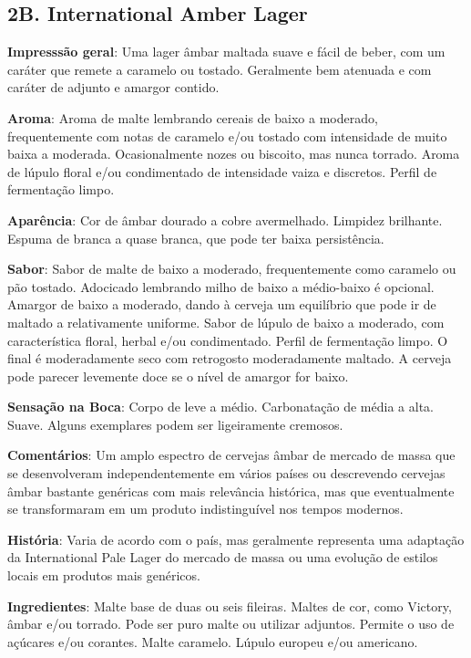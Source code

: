 \subsection*{2B. International Amber Lager}
\textbf{Impresssão geral}: Uma lager âmbar maltada suave e fácil de beber, com um caráter que remete a caramelo ou tostado. Geralmente bem atenuada e com caráter de adjunto e amargor contido.

\textbf{Aroma}: Aroma de malte lembrando cereais de baixo a moderado, frequentemente com notas de caramelo e/ou tostado com intensidade de muito baixa a moderada. Ocasionalmente nozes ou biscoito, mas nunca torrado. Aroma de lúpulo floral e/ou condimentado de intensidade vaiza e discretos. Perfil de fermentação limpo.

\textbf{Aparência}: Cor de âmbar dourado a cobre avermelhado. Limpidez brilhante. Espuma de branca a quase branca, que pode ter baixa persistência.

\textbf{Sabor}: Sabor de malte de baixo a moderado, frequentemente como caramelo ou pão tostado. Adocicado lembrando milho de baixo a médio-baixo é opcional. Amargor de baixo a moderado, dando à cerveja um equilíbrio que pode ir de maltado a relativamente uniforme. Sabor de lúpulo de baixo a moderado, com característica floral, herbal e/ou condimentado. Perfil de fermentação limpo. O final é moderadamente seco com retrogosto moderadamente maltado. A cerveja pode parecer levemente doce se o nível de amargor for baixo.

\textbf{Sensação na Boca}: Corpo de leve a médio. Carbonatação de média a alta. Suave. Alguns exemplares podem ser ligeiramente cremosos.

\textbf{Comentários}: Um amplo espectro de cervejas âmbar de mercado de massa que se desenvolveram independentemente em vários países ou descrevendo cervejas âmbar bastante genéricas com mais relevância histórica, mas que eventualmente se transformaram em um produto indistinguível nos tempos modernos.

\textbf{História}: Varia de acordo com o país, mas geralmente representa uma adaptação da International Pale Lager do mercado de massa ou uma evolução de estilos locais em produtos mais genéricos.

\textbf{Ingredientes}: Malte base de duas ou seis fileiras. Maltes de cor, como Victory, âmbar e/ou torrado. Pode ser puro malte ou utilizar adjuntos. Permite o uso de açúcares e/ou corantes. Malte caramelo. Lúpulo europeu e/ou americano.


